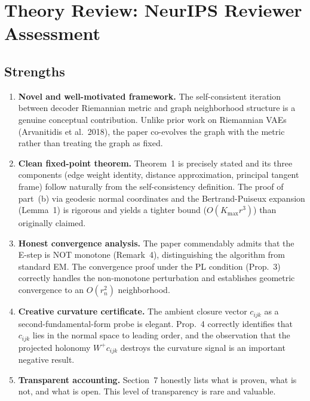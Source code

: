 \documentclass{article}
\begin{document}
\section{Theory Review: NeurIPS Reviewer Assessment}
\label{sec:review}

\subsection{Strengths}

\begin{enumerate}[label=\textbf{S\arabic*.}]
    \item \textbf{Novel and well-motivated framework.} The self-consistent
      iteration between decoder Riemannian metric and graph neighborhood
      structure is a genuine conceptual contribution. Unlike prior work on
      Riemannian VAEs (Arvanitidis et al.\ 2018), the paper co-evolves the
      graph with the metric rather than treating the graph as fixed.

    \item \textbf{Clean fixed-point theorem.} Theorem~1 is precisely stated and
      its three components (edge weight identity, distance approximation,
      principal tangent frame) follow naturally from the self-consistency
      definition. The proof of part~(b) via geodesic normal coordinates and
      the Bertrand-Puiseux expansion (Lemma~1) is rigorous and yields a
      tighter bound ($O(K_{\max} r^3)$) than originally claimed.

    \item \textbf{Honest convergence analysis.} The paper commendably admits
      that the E-step is NOT monotone (Remark~4), distinguishing the algorithm
      from standard EM. The convergence proof under the PL condition (Prop.~3)
      correctly handles the non-monotone perturbation and establishes geometric
      convergence to an $O(r_n^2)$ neighborhood.

    \item \textbf{Creative curvature certificate.} The ambient closure vector
      $c_{ijk}$ as a second-fundamental-form probe is elegant. Prop.~4
      correctly identifies that $c_{ijk}$ lies in the normal space to leading
      order, and the observation that the projected holonomy $W^+ c_{ijk}$
      destroys the curvature signal is an important negative result.

    \item \textbf{Transparent accounting.} Section~7 honestly lists what is
      proven, what is not, and what is open. This level of transparency is
      rare and valuable.
\end{enumerate}
\end{document}
